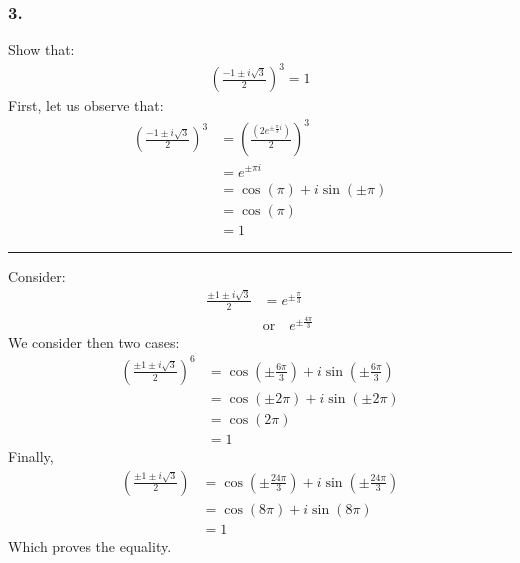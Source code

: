 \subsubsection{3.}
Show that:
\begin{align*}
(\frac{-1 \pm i \sqrt{3}}{2})^3 = 1
\end{align*}
First, let us observe that:
\begin{align*}
(\frac{-1 \pm i \sqrt{3}}{2})^3 &= \left( \frac{ (2 e^{\pm \frac{\pi}{3}i})}{2} \right)^3 \\
 &= e^{ \pm \pi i} \\
 &= \cos(\pi) + i \sin(\pm \pi) \\
 &= \cos(\pi) \\
 &= 1
\end{align*}
\rule{\textwidth}{1pt}
Consider:
\begin{align*}
\frac{\pm 1 \pm i \sqrt{3}}{2} &= e^{\pm \frac{\pi}{3}} \\
&\text{or} \quad e^{\pm \frac{4 \pi}{3}}
\end{align*}
We consider then two cases:
\begin{align*}
	\left( \frac{\pm 1 \pm i \sqrt{3}}{2} \right)^6  &= \cos( \pm \frac{6 \pi}{3} ) + i \sin( \pm \frac{6 \pi}{3}) \\
	&= \cos(\pm 2 \pi) + i \sin( \pm 2 \pi) \\
	&= \cos( 2 \pi) \\
	&= 1
\end{align*}
Finally,
\begin{align*}
\left( \frac{ \pm 1 \pm i \sqrt{3} }{2} \right) &= \cos( \pm \frac{24 \pi}{3}) + i \sin( \pm \frac{24 \pi}{3}) \\
&= \cos(8 \pi) + i \sin(8 \pi) \\
&= 1
\end{align*}
Which proves the equality.
